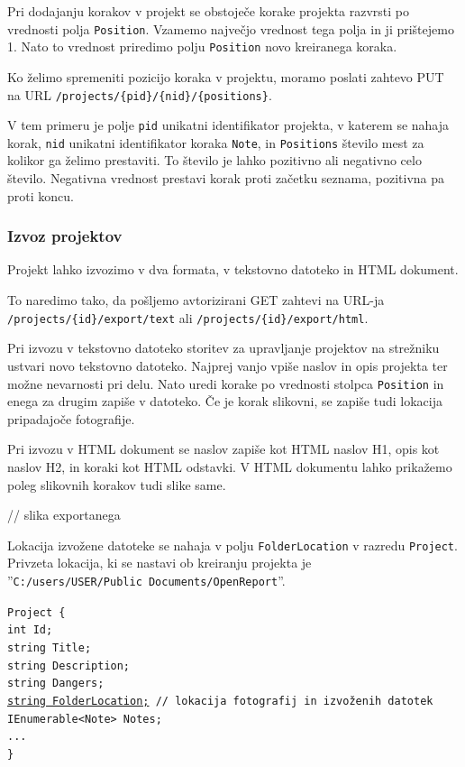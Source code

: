 \documentclass[a4paper, 12pt]{book}
\begin{document}
Pri dodajanju korakov v projekt se obstoječe korake projekta razvrsti po vrednosti polja \texttt{Position}.
Vzamemo največjo vrednost tega polja in ji prištejemo 1.
Nato to vrednost priredimo polju \texttt{Position} novo kreiranega koraka.

Ko želimo spremeniti pozicijo koraka v projektu, moramo poslati zahtevo PUT na URL \texttt{/projects/\{pid\}/\{nid\}/\{positions\}}.

V tem primeru je polje \texttt{pid} unikatni identifikator projekta, v katerem se nahaja korak, \texttt{nid} unikatni identifikator koraka \texttt{Note}, in \texttt{Positions} število mest za kolikor ga želimo prestaviti.
To število je lahko pozitivno ali negativno celo število.
Negativna vrednost prestavi korak proti začetku seznama, pozitivna pa proti koncu.

\subsubsection{Izvoz projektov}

Projekt lahko izvozimo v dva formata, v tekstovno datoteko in HTML dokument.

To naredimo tako, da pošljemo avtorizirani GET zahtevi na URL-ja \texttt{/projects/\{id\}/export/text} ali \texttt{/projects/\{id\}/export/html}.

Pri izvozu v tekstovno datoteko storitev za upravljanje projektov na strežniku ustvari novo tekstovno datoteko.
Najprej vanjo vpiše naslov in opis projekta ter možne nevarnosti pri delu.
Nato uredi korake po vrednosti stolpca \texttt{Position} in enega za drugim zapiše v datoteko.
Če je korak slikovni, se zapiše tudi lokacija pripadajoče fotografije.

Pri izvozu v HTML dokument se naslov zapiše kot HTML naslov H1, opis kot naslov H2, in koraki kot HTML odstavki.
V HTML dokumentu lahko prikažemo poleg slikovnih korakov tudi slike same.

// slika exportanega 

Lokacija izvožene datoteke se nahaja v polju \texttt{FolderLocation} v razredu \texttt{Project}.
Privzeta lokacija, ki se nastavi ob kreiranju projekta je 
\\''\texttt{C:/users/USER/Public Documents/OpenReport}''.

\noindent \texttt{Project \{ \\
int Id; \\
string Title; \\
string Description; \\
string Dangers; \\
\underline{string FolderLocation;} // lokacija fotografij in izvoženih datotek \\
IEnumerable<Note> Notes; \\
... \\
\}
}
\end{document}
